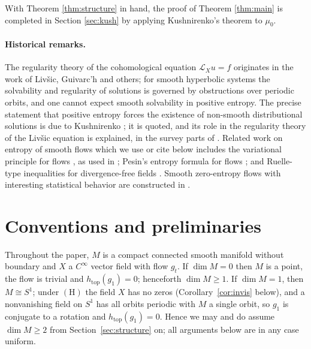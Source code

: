 \documentclass[11pt]{amsart}
\theoremstyle{plain}
\theoremstyle{definition}
\theoremstyle{remark}
\newcommand{\Lx}{\mathcal{L}_X}
\begin{document}
With Theorem \ref{thm:structure} in hand, the proof of Theorem
\ref{thm:main} is completed in Section \ref{sec:kush} by applying
Kushnirenko's theorem to $\mu_0$.

\paragraph{Historical remarks.}
The regularity theory of the cohomological equation
$\Lx u=f$ originates in the work of Liv\v{s}ic, Guivarc'h and others; for
smooth hyperbolic systems the solvability and regularity of solutions is
governed by obstructions over periodic orbits, and one cannot expect
smooth solvability in positive entropy. The precise statement that
positive entropy forces the existence of non-smooth distributional
solutions is due to Kushnirenko \cite{Kus}; it is quoted, and its role
in the regularity theory of the Liv\v{s}ic equation is explained, in the
survey parts of \cite{dlLMM}. Related work on entropy of smooth flows
which we use or cite below includes the variational principle for flows
\cite{Good}, as used in \cite{LWW}; Pesin's entropy formula for flows
\cite{HPT}; and Ruelle-type inequalities for divergence-free fields
\cite{BCF}. Smooth zero-entropy flows with interesting statistical
behavior are constructed in \cite{Dolgopyat}.

\section{Conventions and preliminaries}\label{sec:prelim}

Throughout the paper, $M$ is a compact connected smooth manifold without
boundary and $X$ a $C^\infty$ vector field with flow $g_t$. If
$\dim M=0$ then $M$ is a point, the flow is trivial and
$h_{\mathrm{top}}(g_1)=0$; henceforth $\dim M\ge 1$. If $\dim M=1$, then
$M\cong S^1$; under $(\mathrm{H})$ the field $X$ has no zeros
(Corollary~\ref{cor:invis} below), and a nonvanishing field on $S^1$ has
all orbits periodic with $M$ a single orbit, so $g_1$ is conjugate to a
rotation and $h_{\mathrm{top}}(g_1)=0$. Hence we may and do assume
$\dim M\ge 2$ from Section~\ref{sec:structure} on; all arguments below
are in any case uniform.
\end{document}
